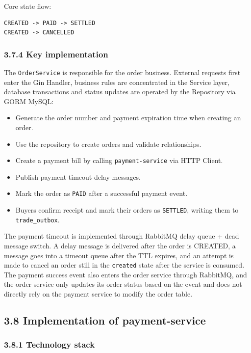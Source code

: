 \documentclass{article}
\begin{document}
Core state flow:

\begin{verbatim}
CREATED -> PAID -> SETTLED
CREATED -> CANCELLED
\end{verbatim}

\subsubsection{3.7.4 Key implementation}

The \texttt{OrderService} is responsible for the order business. External requests first enter the Gin Handler, business rules are concentrated in the Service layer, database transactions and status updates are operated by the Repository via GORM MySQL:

\begin{itemize}
    \item Generate the order number and payment expiration time when creating an order.
    \item Use the repository to create orders and validate relationships.
    \item Create a payment bill by calling \texttt{payment-service} via HTTP Client.
    \item Publish payment timeout delay messages.
    \item Mark the order as \texttt{PAID} after a successful payment event.
    \item Buyers confirm receipt and mark their orders as \texttt{SETTLED}, writing them to \texttt{trade\_outbox}.
\end{itemize}

The payment timeout is implemented through RabbitMQ delay queue + dead message switch. A delay message is delivered after the order is CREATED, a message goes into a timeout queue after the TTL expires, and an attempt is made to cancel an order still in the \texttt{created} state after the service is consumed. The payment success event also enters the order service through RabbitMQ, and the order service only updates its order status based on the event and does not directly rely on the payment service to modify the order table.

\subsection{3.8 Implementation of payment-service}

\subsubsection{3.8.1 Technology stack}
\end{document}
